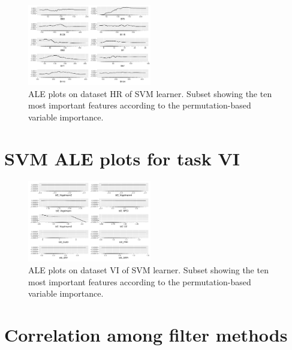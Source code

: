 \documentclass[letterpaper, peerreview]{IEEEtran}
\begin{document}
\begin{figure} [ht]
	\begin{center}
		\includegraphics[width=0.48\textwidth] {fi-hr-ale-1.pdf}
		\caption{ALE plots on dataset HR of SVM learner. Subset showing the ten most important features according to the permutation-based variable importance.}\label{fig:fi-hr-ale}
	\end{center}
\end{figure}

\pagebreak

\section{SVM ALE plots for task VI}

\begin{figure} [ht]
	\begin{center}
		\includegraphics[width=0.48\textwidth] {fi-vi-ale-1.pdf}
		\caption{ALE plots on dataset VI of SVM learner. Subset showing the ten most important features according to the permutation-based variable importance.}\label{fig:fi-vi-ale}
	\end{center}
\end{figure}

\pagebreak

\section{Correlation among filter methods}
\end{document}
